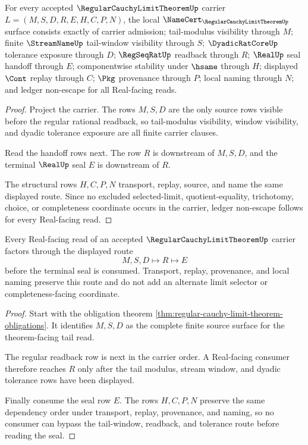 \begin{theorem}
\label{thm:regular-cauchy-limit-theorem-obligations}
For every accepted $\RegularCauchyLimitTheoremUp$ carrier $L=(M,S,D,R,E,H,C,P,N)$, the local $\NameCert_{\RegularCauchyLimitTheoremUp}$ surface consists exactly of carrier admission; tail-modulus visibility through $M$; finite $\StreamNameUp$ tail-window visibility through $S$; $\DyadicRatCoreUp$ tolerance exposure through $D$; $\RegSeqRatUp$ readback through $R$; $\RealUp$ seal handoff through $E$; componentwise stability under $\hsame$ through $H$; displayed $\Cont$ replay through $C$; $\Pkg$ provenance through $P$; local naming through $N$; and ledger non-escape for all Real-facing reads.
\end{theorem}
\begin{proof}
Project the carrier. The rows $M,S,D$ are the only source rows visible before the regular rational readback, so tail-modulus visibility, window visibility, and dyadic tolerance exposure are all finite carrier clauses.

Read the handoff rows next. The row $R$ is downstream of $M,S,D$, and the terminal $\RealUp$ seal $E$ is downstream of $R$.

The structural rows $H,C,P,N$ transport, replay, source, and name the same displayed route. Since no excluded selected-limit, quotient-equality, trichotomy, choice, or completeness coordinate occurs in the carrier, ledger non-escape follows for every Real-facing read.
\end{proof}

\begin{theorem}
\label{thm:regular-cauchy-limit-theorem-tail-seal-handoff}
Every Real-facing read of an accepted $\RegularCauchyLimitTheoremUp$ carrier factors through the displayed route
$$
M,S,D \longmapsto R \longmapsto E
$$
before the terminal seal is consumed. Transport, replay, provenance, and local naming preserve this route and do not add an alternate limit selector or completeness-facing coordinate.
\end{theorem}
\begin{proof}
Start with the obligation theorem \autoref{thm:regular-cauchy-limit-theorem-obligations}. It identifies $M,S,D$ as the complete finite source surface for the theorem-facing tail read.

The regular readback row is next in the carrier order. A Real-facing consumer therefore reaches $R$ only after the tail modulus, stream window, and dyadic tolerance rows have been displayed.

Finally consume the seal row $E$. The rows $H,C,P,N$ preserve the same dependency order under transport, replay, provenance, and naming, so no consumer can bypass the tail-window, readback, and tolerance route before reading the seal.
\end{proof}

